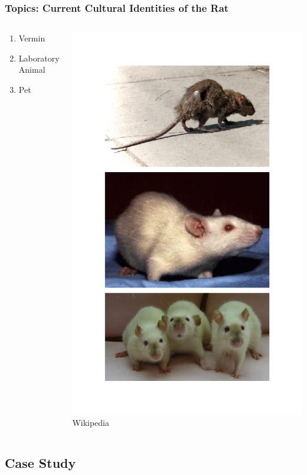 \documentclass{beamer}
\begin{document}
\begin{frame}
\frametitle{Topics: Current Cultural Identities of the Rat}
\begin{columns}
\begin{column}{.5\textwidth}
\begin{enumerate}
\item Vermin
\item Laboratory Animal
\item Pet
\end{enumerate}
\end{column}
\begin{column}{.5\textwidth}
\begin{center}
\includegraphics[width=.75\textwidth,trim={0 .45in 0 .45in}]{RatIdentities}
\linebreak
{\tiny Wikipedia}
\end{center}
\end{column}
\end{columns}
\end{frame}

\subsection[Case Study]{Case Study}
\end{document}
